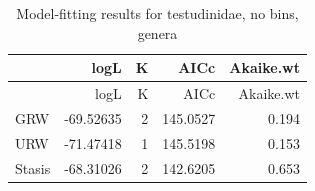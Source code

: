 \documentclass[]{article}
\begin{document}
\begin{longtable}[]{@{}lrrrr@{}}
\caption{Model-fitting results for testudinidae, no bins,
genera}\tabularnewline
\toprule
& logL & K & AICc & Akaike.wt\tabularnewline
\midrule
\endfirsthead
\toprule
& logL & K & AICc & Akaike.wt\tabularnewline
\midrule
\endhead
GRW & -69.52635 & 2 & 145.0527 & 0.194\tabularnewline
URW & -71.47418 & 1 & 145.5198 & 0.153\tabularnewline
Stasis & -68.31026 & 2 & 142.6205 & 0.653\tabularnewline
\bottomrule
\end{longtable}
\end{document}
